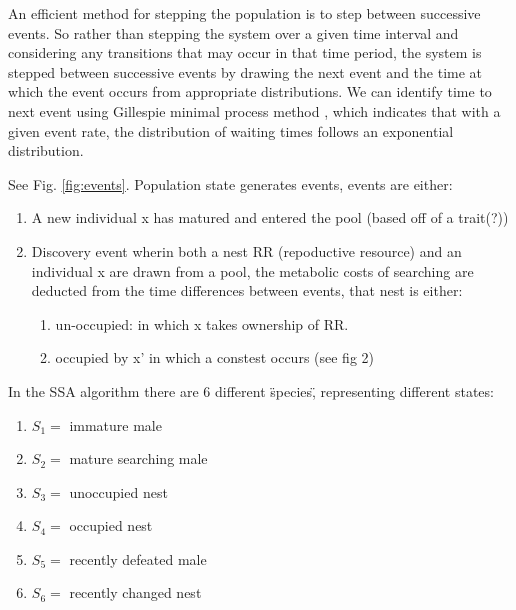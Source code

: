 \documentclass[a4paper,11pt]{article}
\begin{document}
An efficient method for stepping the population is to step between successive events. So rather than stepping the system over a given time interval and considering any transitions that may occur in that time period, the system is stepped between successive events by drawing the next event and the time at which the event occurs from appropriate distributions.  We can identify time to next event using Gillespie minimal process method \citep{Gillespie-1976}, which indicates that with a given event rate, the distribution of waiting times follows an exponential distribution.

See Fig. \ref{fig:events}. Population state generates events, events are either:
\begin{enumerate}
    \item A new individual x has matured and entered the pool (based off of a trait(?))
    \item Discovery event wherin both a nest RR (repoductive resource) and an individual x are drawn from a pool, the metabolic costs of searching are deducted from the time differences between events, that nest is either:
    \begin{enumerate}
        \item un-occupied: in which x takes ownership of RR.
        \item occupied by x' in which a constest occurs (see fig 2)
    \end{enumerate}
\end{enumerate}

In the SSA algorithm \citep{Gillespie-1976} there are 6 different \"species\", representing different states:
\begin{enumerate}
    \item $S_1 = $ immature male
    \item $S_2 = $ mature searching male
    \item $S_3 = $ unoccupied nest
    \item $S_4 = $ occupied nest
    \item $S_5 = $ recently defeated male
    \item $S_6 = $ recently changed nest
\end{enumerate}
\end{document}
